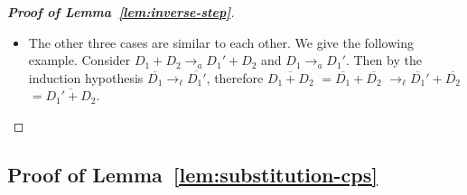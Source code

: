 \documentclass{LMCS}
\newcommand{\xto}[1]{\ensuremath{\rightarrow_{#1}}}
\newcommand{\tolinred}{\xto{\ell}}
\newcommand{\toalgred}{\xto{a}}
\begin{document}
\begin{proof}[\bf Proof of Lemma~\ref{lem:inverse-step}]
\begin{itemize}
\begin{itemize}
	\item The other three cases are similar to each other. We give the following
	  example. Consider $D_{1}+D_{2}\toalgred D_{1}'+D_{2}$ and $D_{1}\toalgred D_{1}'$.
	  Then by the induction hypothesis $\overline{D_{1}}\tolinred\overline{D_{1}'}$,
	  therefore 
	  $\overline{D_{1}+D_{2}}$
	  $=\overline{D_{1}}+\overline{D_{2}}$
	  $\tolinred\overline{D_{1}}'+\overline{D_{2}}$
	  $=\overline{D_{1}'+D_{2}}$.
	  \qedhere
      \end{itemize}
  \end{itemize}
\end{proof}

\subsection{Proof of Lemma~\ref{lem:substitution-cps}}\label{proof:substitution-cps}~
\end{document}
